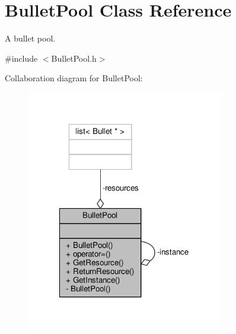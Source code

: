 \hypertarget{class_bullet_pool}{\section{Bullet\-Pool Class Reference}
\label{class_bullet_pool}
}


A bullet pool.  




{\ttfamily \#include $<$Bullet\-Pool.\-h$>$}



Collaboration diagram for Bullet\-Pool\-:
\nopagebreak
\begin{figure}[H]
\begin{center}
\leavevmode
\includegraphics[width=243pt]{class_bullet_pool__coll__graph}
\end{center}
\end{figure}

